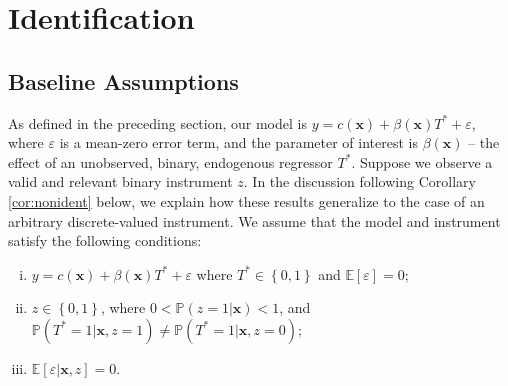 \section{Identification}
\label{sec:identification}

\subsection{Baseline Assumptions}
\label{sec:baseline}
As defined in the preceding section, our model is $y = c(\mathbf{x}) + \beta(\mathbf{x}) T^* + \varepsilon$, where $\varepsilon$ is a mean-zero error term, and the parameter of interest is $\beta(\mathbf{x})$ -- the effect of an unobserved, binary, endogenous regressor $T^*$.
Suppose we observe a valid and relevant binary instrument $z$.
In the discussion following Corollary \ref{cor:nonident} below, we explain how these results generalize to the case of an arbitrary discrete-valued instrument.
We assume that the model and instrument satisfy the following conditions:
\begin{assump} \mbox{}
  \label{assump:model}
  \begin{enumerate}[(i)] 
    \item $y = c(\mathbf{x}) + \beta(\mathbf{x})T^* + \varepsilon$ where $T^* \in \left\{ 0,1 \right\}$ and $\mathbb{E}[\varepsilon]=0$;
    \item  $z \in \left\{ 0,1 \right\}$, where $0 < \mathbb{P}(z=1|\mathbf{x}) < 1$, and $\mathbb{P}(T^*=1|\mathbf{x},z=1) \neq \mathbb{P}(T^*=1|\mathbf{x},z=0)$;
    \item $\mathbb{E}[\varepsilon|\mathbf{x},z] = 0$.
  \end{enumerate}
\end{assump}

